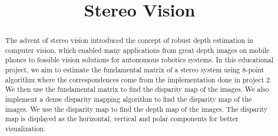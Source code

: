 \documentclass[conference]{IEEEtran}
\begin{document}
\title{Stereo Vision\\
}

\makeatletter
\newcommand{\linebreakand}{%
  \end{@IEEEauthorhalign}
  \hfill\mbox{}\par
  \mbox{}\hfill\begin{@IEEEauthorhalign}
}
\makeatother

\author{
\and
{}
}

\maketitle


\begin{abstract}
The advent of stereo vision introduced the concept of robust depth estimation in computer vision, which enabled many applications from great depth images on mobile phones to feasible vision solutions for autonomous robotics systems. In this educational project, we aim to estimate the fundamental matrix of a stereo system using 8-point algorithm where the correspondences come from the implementation done in project 2. We then use the fundamental matrix to find the disparity map of the images. We also implement a dense disparity mapping algorithm to find the disparity map of the images. We use the disparity map to find the depth map of the images. The disparity map is displayed as the horizontal, vertical and polar components for better visualization.
\end{abstract}
\end{document}
